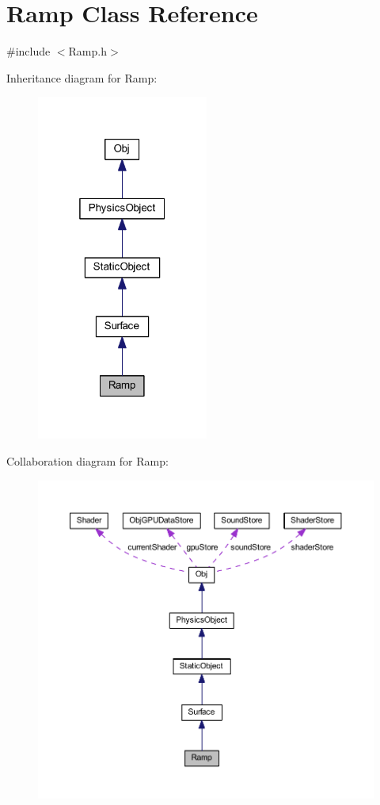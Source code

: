 \hypertarget{class_ramp}{}\section{Ramp Class Reference}
\label{class_ramp}


{\ttfamily \#include $<$Ramp.\+h$>$}



Inheritance diagram for Ramp\+:
\nopagebreak
\begin{figure}[H]
\begin{center}
\leavevmode
\includegraphics[width=160pt]{class_ramp__inherit__graph}
\end{center}
\end{figure}


Collaboration diagram for Ramp\+:
\nopagebreak
\begin{figure}[H]
\begin{center}
\leavevmode
\includegraphics[width=350pt]{class_ramp__coll__graph}
\end{center}
\end{figure}
